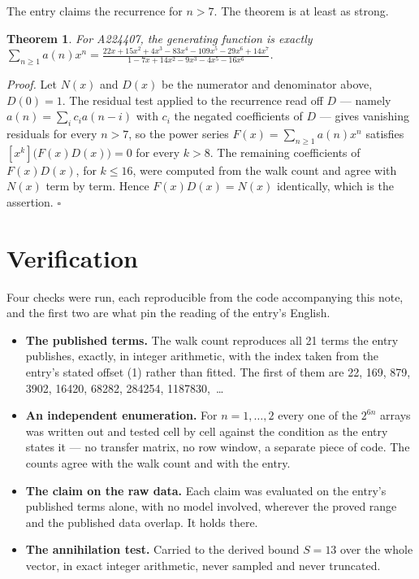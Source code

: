\documentclass[11pt]{article}
\newtheorem{theorem}{Theorem}
\theoremstyle{definition}
\begin{document}
The entry claims the recurrence for $n > 7$. The theorem is at least as strong.

\begin{theorem} For A224407, the generating function is exactly $\sum_{n\ge 1} a(n)x^n = \frac{22x + 15x^{2} + 4x^{3} - 83x^{4} - 109x^{5} - 29x^{6} + 14x^{7}}{1 - 7x + 14x^{2} - 9x^{3} - 4x^{5} - 16x^{6}}$.\end{theorem}

{\itshape Proof.} Let $N(x)$ and $D(x)$ be the numerator and denominator above, $D(0)=1$. The residual test applied to the recurrence read off $D$ --- namely $a(n) = \sum_i c_i a(n-i)$ with $c_i$ the negated coefficients of $D$ --- gives vanishing residuals for every $n > 7$, so the power series $F(x)=\sum_{n\ge 1}a(n)x^n$ satisfies $[x^k]\bigl(F(x)D(x)\bigr) = 0$ for every $k > 8$. The remaining coefficients of $F(x)D(x)$, for $k \le 16$, were computed from the walk count and agree with $N(x)$ term by term. Hence $F(x)D(x) = N(x)$ identically, which is the assertion. $\square$

\section{Verification}

Four checks were run, each reproducible from the code accompanying this note, and the first two are what pin the reading of the entry's English.

\begin{itemize}

\item {\bfseries The published terms.} The walk count reproduces all 21 terms the entry publishes, exactly, in integer arithmetic, with the index taken from the entry's stated offset (1) rather than fitted. The first of them are 22, 169, 879, 3902, 16420, 68282, 284254, 1187830,~\dots

\item {\bfseries An independent enumeration.} For $n = 1,\dots,2$ every one of the $2^{6n}$ arrays was written out and tested cell by cell against the condition as the entry states it --- no transfer matrix, no row window, a separate piece of code. The counts agree with the walk count and with the entry.

\item {\bfseries The claim on the raw data.} Each claim was evaluated on the entry's published terms alone, with no model involved, wherever the proved range and the published data overlap. It holds there.

\item {\bfseries The annihilation test.} Carried to the derived bound $S = 13$ over the whole vector, in exact integer arithmetic, never sampled and never truncated.

\end{itemize}
\end{document}
